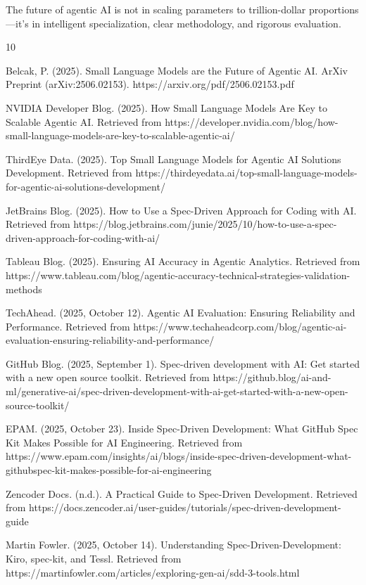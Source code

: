 \documentclass[11pt,a4paper]{article}
\begin{document}
The future of agentic AI is not in scaling parameters to trillion-dollar proportions—it's in intelligent specialization, clear methodology, and rigorous evaluation.

\begin{thebibliography}{10}

Belcak, P. (2025). Small Language Models are the Future of Agentic AI. 
ArXiv Preprint (arXiv:2506.02153). https://arxiv.org/pdf/2506.02153.pdf

NVIDIA Developer Blog. (2025). How Small Language Models Are Key to Scalable Agentic AI.
Retrieved from https://developer.nvidia.com/blog/how-small-language-models-are-key-to-scalable-agentic-ai/

ThirdEye Data. (2025). Top Small Language Models for Agentic AI Solutions Development.
Retrieved from https://thirdeyedata.ai/top-small-language-models-for-agentic-ai-solutions-development/

JetBrains Blog. (2025). How to Use a Spec-Driven Approach for Coding with AI.
Retrieved from https://blog.jetbrains.com/junie/2025/10/how-to-use-a-spec-driven-approach-for-coding-with-ai/

Tableau Blog. (2025). Ensuring AI Accuracy in Agentic Analytics.
Retrieved from https://www.tableau.com/blog/agentic-accuracy-technical-strategies-validation-methods

TechAhead. (2025, October 12). Agentic AI Evaluation: Ensuring Reliability and Performance. 
Retrieved from https://www.techaheadcorp.com/blog/agentic-ai-evaluation-ensuring-reliability-and-performance/

GitHub Blog. (2025, September 1). Spec-driven development with AI: Get started with a new open source toolkit. 
Retrieved from https://github.blog/ai-and-ml/generative-ai/spec-driven-development-with-ai-get-started-with-a-new-open-source-toolkit/

EPAM. (2025, October 23). Inside Spec-Driven Development: What GitHub Spec Kit Makes Possible for AI Engineering. 
Retrieved from https://www.epam.com/insights/ai/blogs/inside-spec-driven-development-what-githubspec-kit-makes-possible-for-ai-engineering

Zencoder Docs. (n.d.). A Practical Guide to Spec-Driven Development. 
Retrieved from https://docs.zencoder.ai/user-guides/tutorials/spec-driven-development-guide

Martin Fowler. (2025, October 14). Understanding Spec-Driven-Development: Kiro, spec-kit, and Tessl. 
Retrieved from https://martinfowler.com/articles/exploring-gen-ai/sdd-3-tools.html

\end{thebibliography}
\end{document}
